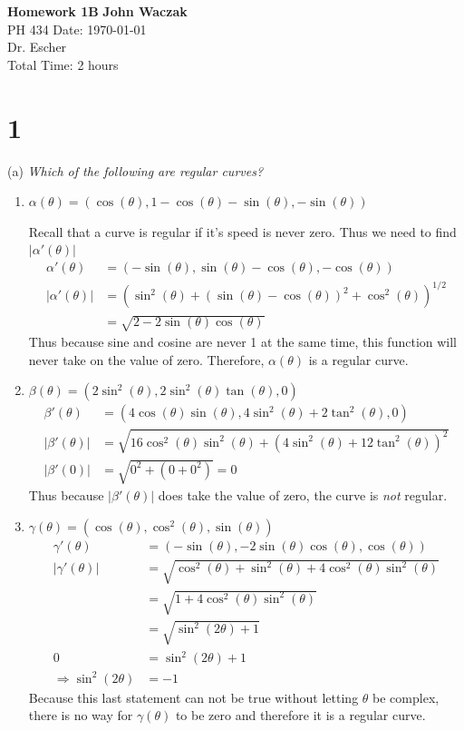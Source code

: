 \documentclass[a4paper, 11pt]{article}
\begin{document}
\noindent
\large\textbf{Homework 1B} \hfill \textbf{John Waczak} \\
\normalsize PH 434 \hfill  Date: \today \\
Dr. Escher  \\
Total Time: 2 hours \\ 

\section*{1} (a) \textit{Which of the following are regular curves? }
	\begin{enumerate}
		\item $\alpha(\theta) = (\cos(\theta), 1-\cos(\theta)-\sin(\theta), -\sin(\theta))$
		
		Recall that a curve is regular if it's speed is never zero. Thus we need to find $|\alpha'(\theta)|$
		\begin{align*}
			\alpha'(\theta) &= (-\sin(\theta), \sin(\theta)-\cos(\theta), -\cos(\theta)) \\ 
			|\alpha'(\theta)| &= (\sin^2(\theta)+(\sin(\theta)-\cos(\theta))^2+\cos^2(\theta))^{1/2} \\ 
				&= \sqrt{2-2\sin(\theta)\cos(\theta)}
		\end{align*}
		Thus because sine and cosine are never 1 at the same time, this function will never take on the value of zero. Therefore, $\alpha(\theta)$ is a regular curve. 
		
		\item $\beta(\theta) = (2\sin^2(\theta), 2\sin^2(\theta)\tan(\theta), 0)$
		\begin{align*}
			\beta'(\theta) &= (4\cos(\theta)\sin(\theta), 4\sin^2(\theta)+2\tan^2(\theta), 0) \\ 
			|\beta'(\theta)| &= \sqrt{16\cos^2(\theta)\sin^2(\theta) + (4\sin^2(\theta)+12\tan^2(\theta))^2} \\ 
			|\beta'(0)| &= \sqrt{0^2 + (0+0^2)} = 0 
		\end{align*}
		Thus because $|\beta'(\theta)|$ does take the value of zero, the curve is \textit{not} regular. 
		
		\item $\gamma(\theta) = (\cos(\theta), \cos^2(\theta), \sin(\theta))$
		\begin{align*}
			\gamma'(\theta) &= (-\sin(\theta), -2\sin(\theta)\cos(\theta), \cos(\theta)) \\ 
			|\gamma'(\theta)| &= \sqrt{\cos^2(\theta)+\sin^2(\theta)+4\cos^2(\theta)\sin^2(\theta)} \\ 
				&= \sqrt{1+4\cos^2(\theta)\sin^2(\theta)} \\ 
				&= \sqrt{\sin^2(2\theta)+1} \\ 
				0 &= \sin^2(2\theta)+1 \\ 
				\Rightarrow \sin^2(2\theta) &= -1
		\end{align*}
		Because this last statement can not be true without letting $\theta$ be complex, there is no way for $\gamma(\theta)$ to be zero and therefore it is a regular curve. 
	\end{enumerate} 
\end{document}
